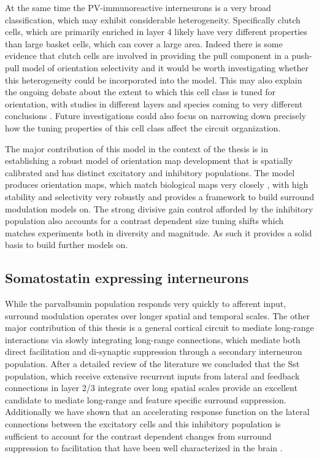 At the same time the PV-immunoreactive interneurons is a very broad
classification, which may exhibit considerable
heterogeneity. Specifically clutch cells, which are primarily enriched
in layer 4 likely have very different properties than large basket
cells, which can cover a large area. Indeed there is some evidence
that clutch cells are involved in providing the pull component in a
push-pull model of orientation selectivity and it would be worth
investigating whether this heterogeneity could be incorporated into
the model. This may also explain the ongoing debate about the extent
to which this cell class is tuned for orientation, with studies in
different layers and species coming to very different conclusions
\citep{Cardin2007, Ma2011, Hofer2011}. Future investigations could
also focus on narrowing down precisely how the tuning properties of
this cell class affect the circuit organization.

The major contribution of this model in the context of the thesis is
in establishing a robust model of orientation map development that is
spatially calibrated and has distinct excitatory and inhibitory
populations. The model produces orientation maps, which match
biological maps very closely \citep{Kaschube2010, Stevens2013b}, with
high stability and selectivity very robustly and provides a framework
to build surround modulation models on. The strong divisive gain
control afforded by the inhibitory population also accounts for a
contrast dependent size tuning shifts which matches experiments both
in diversity and magnitude. As such it provides a solid basis to build
further models on.

\subsection{Somatostatin expressing interneurons}

While the parvalbumin population responds very quickly to afferent
input, surround modulation operates over longer spatial and temporal
scales. The other major contribution of this thesis is a general
cortical circuit to mediate long-range interactions via slowly
integrating long-range connections, which mediate both direct
facilitation and di-synaptic suppression through a secondary
interneuron population. After a detailed review of the literature we
concluded that the Sst population, which receive extensive recurrent
inputs from lateral and feedback connections in layer 2/3 integrate
over long spatial scales \citep{Xu2009, Adesnik2012, Nienborg2013}
provide an excellent candidate to mediate long-range and feature
specific surround suppression. Additionally we have shown that an
accelerating response function on the lateral connections between the
excitatory cells and this inhibitory population is sufficient to
account for the contrast dependent changes from surround suppression
to facilitation that have been well characterized in the brain
\citep{Levitt1997, Polat1998, Dragoi2000, Wang2009}.

